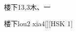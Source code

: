 \begin{entry}{楼下}{13,3}{⽊、⼀}
  \begin{phonetics}{楼下}{lou2 xia4}[][HSK 1]
  \end{phonetics}
\end{entry}
